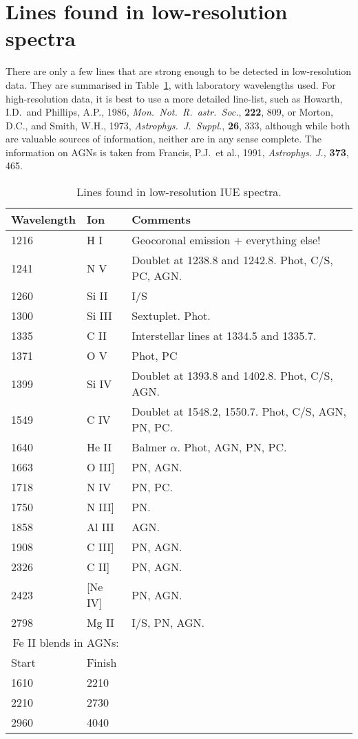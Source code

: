 \section{Lines found in low-resolution spectra}

\begin{latexonly}
There are only a few lines that are strong enough to be detected in
low-resolution data.  They are summarised in Table~\ref{ta:one}, with
laboratory
wavelengths used.  For high-resolution data, it is best to use a more detailed
line-list, such as Howarth, I.D.\ and Phillips, A.P., 1986, {\it Mon.\ Not.\
R.\ astr.\ Soc.}, {\bf 222}, 809, or Morton, D.C., and Smith, W.H., 1973,
{\it Astrophys.\ J.\ Suppl.}, {\bf 26}, 333, although while both are valuable
sources of information, neither are in any sense complete.  The information on
AGNs is taken from Francis, P.J.~et al., 1991, {\it Astrophys. J.,} {\bf 373},
465.

\begin{table}
\caption[Lines found in low-resolution IUE spectra]
{Lines found in low-resolution IUE spectra.}
\begin{tabular}{lll} \hline
Wavelength & Ion & Comments \\ \hline
1216   & H I & Geocoronal emission + everything else! \\
1241   & N V & Doublet at 1238.8 and 1242.8. Phot, C/S, PC, AGN. \\
1260   & Si II & I/S \\
1300   & Si III & Sextuplet. Phot. \\
1335   & C II  & Interstellar lines at 1334.5 and 1335.7. \\
1371   & O V   & Phot, PC \\
1399   & Si IV & Doublet at 1393.8 and 1402.8. Phot, C/S, AGN. \\
1549   & C IV & Doublet at 1548.2, 1550.7. Phot, C/S, AGN, PN, PC. \\
1640   & He II & Balmer $\alpha$. Phot, AGN, PN, PC.  \\
1663   & O III] & PN, AGN.\\
1718   & N IV & PN, PC. \\
1750   & N III] & PN. \\
1858   & Al III & AGN. \\
1908   & C III] & PN, AGN. \\
2326   & C II]  & PN, AGN. \\
2423  & [Ne IV] & PN, AGN. \\
2798  & Mg II & I/S, PN, AGN. \\
\multicolumn{2}{c}{Fe II blends in AGNs:} & \\
Start & Finish & \\
1610 & 2210 & \\
2210 & 2730 & \\
2960 & 4040 & \\ \hline
\end{tabular}
\label{ta:one}
\end{table}
\end{latexonly}

